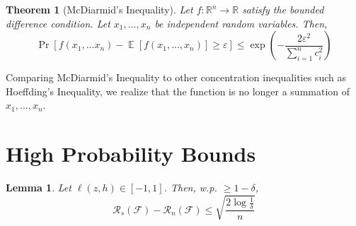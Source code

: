 \documentclass[11pt]{article}
\DeclareMathOperator*{\E}{\mathbb{E}}
\newtheorem{lemma}{Lemma}
\newtheorem{theorem}{Theorem}
\begin{document}
\begin{theorem}[McDiarmid's Inequality]
Let $f:\mathbb{R}^n \to \mathbb{R}$ satisfy the bounded difference condition. Let $x_1,...,x_n$ be independent random variables. Then,
\begin{equation}
\Pr\left[ f(x_1,...x_n) - \E\left[f(x_1,...,x_n)\right] \geq \varepsilon \right] \leq \exp{\left(-\frac{2\varepsilon^{2}}{\sum_{i=1}^n c_i^2}\right)}
\end{equation}
\end{theorem}

Comparing McDiarmid's Inequality to other concentration inequalities such as Hoeffding's Inequality, we realize that the function is no longer a summation of $x_1,\ldots,x_n$.

\section{High Probability Bounds}

\begin{lemma}
Let $\ell(z,h) \in [-1,1]$. Then, w.p. $\geq 1 - \delta$,
\begin{equation}
    \mathcal{R}_s(\mathcal{F}) - \mathcal{R}_n(\mathcal{F}) \leq \sqrt{\frac{2\log{\frac{1}{\delta}}}{n}}
\end{equation}
\end{lemma}
\end{document}
